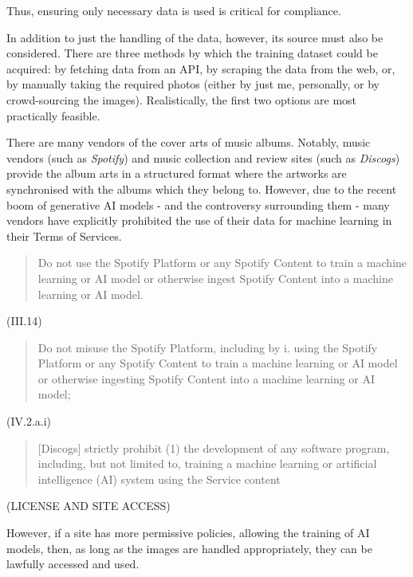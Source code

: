                   Thus, ensuring only necessary data is used is critical for compliance.
  
                  In addition to just the handling of the data, however, its source must also be considered. There are three methods by which the training dataset could be acquired: by fetching data from an API, by scraping the data from the web, or, by manually taking the required photos (either by just me, personally, or by crowd-sourcing the images). Realistically, the first two options are most practically feasible.
  
                  There are many vendors of the cover arts of music albums. Notably, music vendors (such as \textit{Spotify}) and music collection and review sites (such as \textit{Discogs}) provide the album arts in a structured format where the artworks are synchronised with the albums which they belong to. However, due to the recent boom of generative AI models - and the controversy surrounding them - many vendors have explicitly prohibited the use of their data for machine learning in their Terms of Services.
  
                  \begin{quote}
                      Do not use the Spotify Platform or any Spotify Content to train a machine learning or AI model or otherwise ingest Spotify Content into a machine learning or AI model.
                  \end{quote} \cite{spotifyDevPolicy} (III.14)
                  \begin{quote}
                      Do not misuse the Spotify Platform, including by i. using the Spotify Platform or any Spotify Content to train a machine learning or AI model or otherwise ingesting Spotify Content into a machine learning or AI model;
                  \end{quote} \cite{spotifyDevTerms} (IV.2.a.i)
                  \begin{quote}
                      [Discogs] strictly prohibit (1) the development of any software program, including, but not limited to, training a machine learning or artificial intelligence (AI) system using the Service content
                  \end{quote} \cite{discogsToS} (LICENSE AND SITE ACCESS)
  
                  However, if a site has more permissive policies, allowing the training of AI models, then, as long as the images are handled appropriately, they can be lawfully accessed and used.
  
